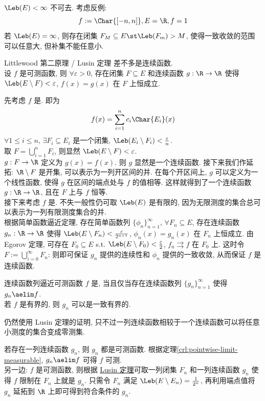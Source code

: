 \begin{rmk}
    \(\Leb(E)<\infty\) 不可去. 考虑反例:
    \[f:=\Char{[-n,n]}, E=\R, f=1\]
    若 \(\Leb(E)=\infty\), 则存在闭集 \(F_M\subseteq E \st \Leb(F_m)>M\), 使得一致收敛的范围可以任意大, 但补集不能任意小.
\end{rmk}
\begin{thm}
    [lusin]
    {Littlewood 第二原理 / Lusin 定理}
    \MeasurableFunc{}差不多是连续函数.\\
    设 \(f\) 是可测函数, 则 \(\forall\varepsilon>0 \), 存在闭集 \(F\subseteq E\) 和连续函数 \(g:\R\to\R\) 使得 \(\Leb(E\setminus F)<\varepsilon\), \(f(x)=g(x)\) 在 \(F\) 上恒成立.
\end{thm}
\begin{prf}
    先考虑 \(f\) 是\SimpleFunc{}. 即为
    \[f(x)=\sum_{i=1}^n c_i \Char{E_i}(x)\]
    \(\forall 1\leq i\leq n\), \(\exists F_i\subseteq E_i\) 是一个闭集, \(\Leb(E_i\setminus F_i)<\frac{\varepsilon}{n}\). \\
    取 \(F=\bigcup_{i=1}^n F_i\), 则显然 \(\Leb(E\setminus F)<\varepsilon\). \\
    \(g:F\to\R\) 定义为 \(g(x)=f(x)\). 则 \(g\) 显然是一个连续函数. 接下来我们作延拓: \(\R\setminus F\) 是开集, 可以表示为一列开区间的并. 
    在每个开区间上, \(g\) 可以定义为一个线性函数, 使得 \(g\) 在区间的端点处与 \(f\) 的值相等. 这样就得到了一个连续函数 \(g:\R\to\R\), 且在 \(F\) 上与 \(f\) 恒等.\\
    接下来考虑 \(f\) 是\MeasurableFunc{}. 不失一般性仍可取 \(\Leb(E)\) 是有限的, 因为无限测度的集合总可以表示为一列有限测度集合的并. \\
    根据简单函数逼近定理, 存在简单函数列 \(\{\phi_n\}_{n=1}^\infty\),  \(\forall F_n\subseteq E\), 存在连续函数 \(g_n:\R\to\R\) 使得 \(\Leb(E\setminus F_n)<\frac{\varepsilon}{2^{n+1}}\), \(\phi_n(x)=g_n(x)\) 在 \(F_n\) 上恒成立. 
    由 Egorov 定理, 可存在 \(F_0\subseteq E\) s.t. \(\Leb(E\setminus F_0)<\frac{\varepsilon}{2}\), \(f_n\rightrightarrows f\) 在 \(F_0\) 上. 这时令 \(F:=\bigcup_{i=0}^{\infty}F_n\): 则即可保证 \(g_n\) 提供的连续性和 \(\phi_n\) 提供的一致收敛, 从而保证 \(f\) 是连续函数.
\end{prf}
\begin{thm}
    {连续函数列逼近可测函数}
    \(f\) 是\MeasurableFunc{}, 当且仅当存在连续函数列 \(\{g_n\}_{n=1}^\infty\) 使得 \(g_n\aelim f\).\\
    若 \(f\) 是有界的, 则 \(g_n\) 可以是一致有界的.
\end{thm}
\begin{rmk}
    仍然使用 Lusin 定理的证明, 只不过一列连续函数相较于一个连续函数可以将任意小测度的集合变成零测集.
\end{rmk}
\begin{prf}
    若存在一列连续函数 \(g_n\), 则 \(g_n\) 都是可测函数. 根据定理\ref{crl:pointwise-limit-measurable}, \(g_n\aelim f\) 可得 \(f\) 可测.\\
    另一边: \(f\) 是可测函数, 则根据 \hyperref[thm:lusin]{Lusin 定理}可取一列闭集 \(F_n\) 和一列连续函数 \(g_n\) 使得 \(f\) 限制在 \(F_n\) 上就是 \(g_n\). 只需令 \(F_n\) 满足 \(\Leb(E\setminus E_n)=\frac{1}{2^n}\), 再利用端点值将 \(g_n\) 延拓到 \(\R\) 上即可得到符合条件的 \(g_n\).
\end{prf}
